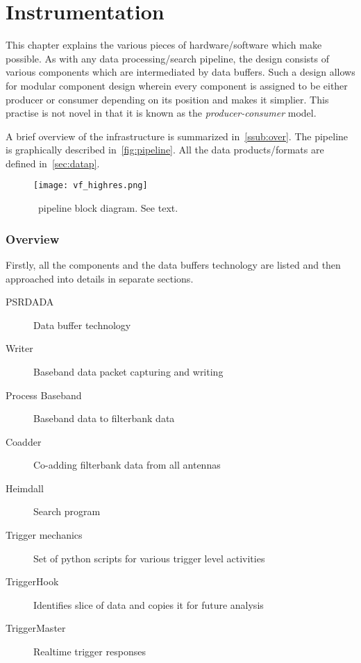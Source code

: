 \chapter{Instrumentation}
\label{ch:inst}

\par This chapter explains the various pieces of hardware/software which make \vf possible. 
As with any data processing/search pipeline, the design consists of various components which are intermediated by data buffers. 
Such a design allows for modular component design wherein every component is assigned to be either producer or consumer depending on its position and makes it simplier. This practise is not novel in that it is known as the \emph{producer-consumer} model.

\par A brief overview of the infrastructure is summarized in~\autoref{ssub:over}. 
The pipeline is graphically described in~\autoref{fig:pipeline}. All the data products/formats are defined in~\autoref{sec:datap}.


\begin{figure}[ht]
	\label{fig:pipeline}
	\centering
	\texttt{[image: vf\_highres.png]}
	\caption{\vf~pipeline block diagram. See text.}
\end{figure}

\subsection {Overview}
\label{ssub:over}

\par Firstly, all the components and the data buffers technology are listed and then approached into details in separate sections.
\begin{description}
\item[PSRDADA] Data buffer technology
\item[Writer]  Baseband data packet capturing and writing
\item[Process Baseband] Baseband data to filterbank data
\item[Coadder] Co-adding filterbank data from all antennas
\item[Heimdall] Search program 
\item[Trigger mechanics] Set of python scripts for various trigger level activities
\item[TriggerHook]   Identifies slice of data and copies it for future analysis
\item[TriggerMaster] Realtime trigger responses
\end{description}

